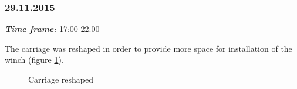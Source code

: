 \subsubsection{29.11.2015}
\textit{\textbf{Time frame:}} 17:00-22:00 

The carriage was reshaped in order to provide more space for installation of the winch (figure \ref{Wheelbase1.3}).

  	\begin{figure}[H]
  		\begin{minipage}[h]{1\linewidth}
  			\caption{Carriage reshaped}
  			\label{Wheelbase1.3}
  		\end{minipage}
  	\end{figure}
  	
